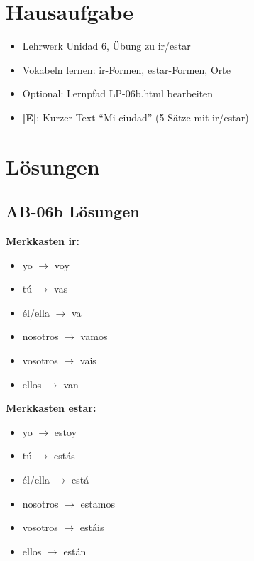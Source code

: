 \documentclass[11pt,a4paper]{article}
\newcommand{\E}{\textcolor{erweiterung}{\textbf{[E]}}}
\begin{document}
\section{Hausaufgabe}

\begin{itemize}
    \item Lehrwerk Unidad 6, Übung zu ir/estar
    \item Vokabeln lernen: ir-Formen, estar-Formen, Orte
    \item Optional: Lernpfad LP-06b.html bearbeiten
    \item \E{}: Kurzer Text ``Mi ciudad'' (5 Sätze mit ir/estar)
\end{itemize}

\section{Lösungen}

\subsection{AB-06b Lösungen}

\textbf{Merkkasten ir:}
\begin{itemize}
    \item yo $\rightarrow$ voy
    \item tú $\rightarrow$ vas
    \item él/ella $\rightarrow$ va
    \item nosotros $\rightarrow$ vamos
    \item vosotros $\rightarrow$ vais
    \item ellos $\rightarrow$ van
\end{itemize}

\textbf{Merkkasten estar:}
\begin{itemize}
    \item yo $\rightarrow$ estoy
    \item tú $\rightarrow$ estás
    \item él/ella $\rightarrow$ está
    \item nosotros $\rightarrow$ estamos
    \item vosotros $\rightarrow$ estáis
    \item ellos $\rightarrow$ están
\end{itemize}
\end{document}
